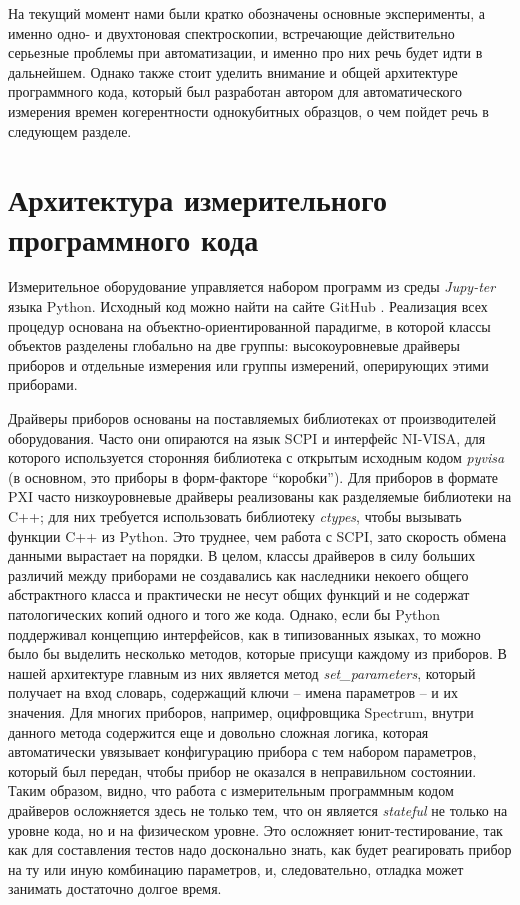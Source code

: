 \documentclass[14pt, a4paper]{extreport}
\numberwithin{equation}{section}
\begin{document}
На текущий момент нами были кратко обозначены основные эксперименты, а именно одно- и двухтоновая спектроскопии, встречающие действительно серьезные проблемы при автоматизации, и именно про них речь будет идти в дальнейшем. Однако также стоит уделить внимание и общей архитектуре программного кода, который был разработан автором для автоматического измерения времен когерентности однокубитных образцов, о чем пойдет речь в следующем разделе.

\section{Архитектура измерительного программного кода}

Измерительное оборудование управляется набором программ из среды \foreignlanguage{english}{\textit{Jupy-ter}} языка \foreignlanguage{english}{Python}. Исходный код можно найти на сайте GitHub \cite{fedorov2021github}. Реализация всех процедур основана на объектно-ориентированной парадигме, в которой классы объектов разделены глобально на две группы: высокоуровневые драйверы приборов и отдельные измерения или группы измерений, оперирующих этими приборами. 

Драйверы приборов основаны на поставляемых библиотеках от производителей оборудования. Часто они опираются на язык SCPI и интерфейс NI-VISA, для которого используется сторонняя библиотека с открытым исходным кодом \textit{pyvisa} (в основном, это приборы в форм-факторе ``коробки''). Для приборов в формате PXI часто низкоуровневые драйверы реализованы как разделяемые библиотеки на C++; для них требуется использовать библиотеку \textit{ctypes}, чтобы вызывать функции C++ из Python. Это труднее, чем работа с SCPI, зато скорость обмена данными вырастает на порядки. В целом, классы драйверов в силу больших различий между приборами не создавались как наследники некоего общего абстрактного класса и практически не несут общих функций и не содержат патологических копий одного и того же кода. Однако, если бы Python поддерживал концепцию интерфейсов, как в типизованных языках, то можно было бы выделить несколько методов, которые присущи каждому из приборов. В нашей архитектуре главным из них является метод \textit{set\_parameters}, который получает на вход словарь, содержащий ключи -- имена параметров -- и их значения. Для многих приборов, например, оцифровщика Spectrum, внутри данного метода содержится еще и довольно сложная логика, которая автоматически увязывает конфигурацию прибора с тем набором параметров, который был передан, чтобы прибор не оказался в неправильном состоянии. Таким образом, видно, что работа с измерительным программным кодом драйверов осложняется здесь не только тем, что он является \textit{stateful} не только на уровне кода, но и на физическом уровне. Это осложняет юнит-тестирование, так как для составления тестов надо досконально знать, как будет реагировать прибор на ту или иную комбинацию параметров, и, следовательно, отладка может занимать достаточно долгое время.
\end{document}
